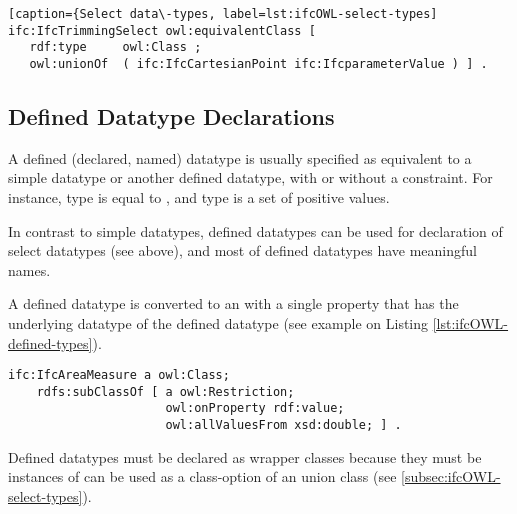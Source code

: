 \begin{lstlisting}[caption={Select data\-types, label=lst:ifcOWL-select-types]
ifc:IfcTrimmingSelect owl:equivalentClass [
   rdf:type     owl:Class ;
   owl:unionOf  ( ifc:IfcCartesianPoint ifc:IfcparameterValue ) ] .
\end{lstlisting}


\subsection{Defined Datatype Declarations}
\label{subsec:ifcOWL-defined-types}

A defined (declared, named) data\-type is usually specified as equivalent to a simple data\-type or another defined data\-type, with or without a constraint. For instance, type  is equal to , and type  is a set of positive  values.

In contrast to simple data\-types, defined data\-types can be used for declaration of select data\-types (see above), and most of defined data\-types have meaningful names. 

\begin{ontologyRule}[caption={Defined data\-types}]
A defined data\-type is converted to an  with a single property  that has the underlying data\-type of the defined data\-type (see example on Listing \ref{lst:ifcOWL-defined-types}).
\end{ontologyRule}

\begin{lstlisting}[caption={Defined data\-types}, label=lst:ifcOWL-defined-types]
ifc:IfcAreaMeasure a owl:Class;
    rdfs:subClassOf [ a owl:Restriction;
                      owl:onProperty rdf:value;
                      owl:allValuesFrom xsd:double; ] .
\end{lstlisting}

Defined data\-types must be declared as wrapper classes because they must be instances of  can be used as a class-option of an union class (see \ref{subsec:ifcOWL-select-types}).







